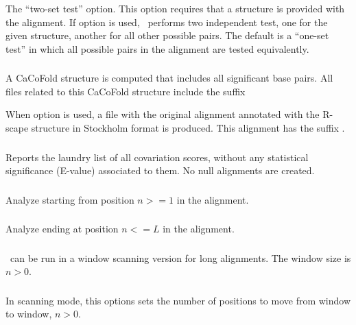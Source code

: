\subsubsection{} The ``two-set test'' option.
This option requires that a structure is provided with the alignment.
If option  is used, \rscape\ performs two independent test,
one for the given structure, another for all other possible pairs.
The default is a ``one-set test'' in which all possible pairs in the
alignment are tested equivalently.


\subsubsection{} A CaCoFold structure is computed that includes all significant base pairs. All files related to this 
CaCoFold structure include the suffix 

When option  is used, a file with the original alignment  annotated with the R-scape structure in Stockholm format is produced.
This alignment has the suffix .

\subsubsection{} Reports the laundry list of all covariation scores, without any statistical significance (E-value)
associated to them. No null alignments are created.

\subsubsection{} Analyze starting from position $n >= 1$ in the alignment.

\subsubsection{} Analyze ending at position $n <= L$ in the alignment.

\subsubsection{} \rscape\ can be run in a window scanning version for long alignments.
The window size is $n>0$.

\subsubsection{} In scanning mode, this options sets the number of positions to move from window to window, $n >0$.

